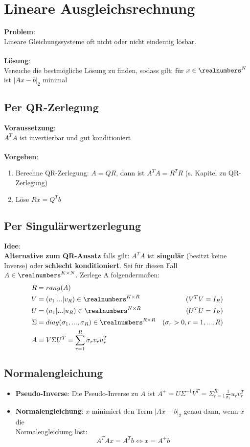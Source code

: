 \section{Lineare Ausgleichsrechnung}%
\label{lar:sec:lineare-ausgleichsrechnung}
\textbf{Problem}:\\Lineare Gleichungssysteme oft nicht oder nicht eindeutig lösbar.\\\\
\textbf{Lösung}:\\Versuche die bestmögliche Lösung zu finden, sodass gilt: für $x \in \realnumbers^N$ ist $|Ax - b|_2$ minimal

\subsection{Per QR-Zerlegung}%
\label{lar:sub:qr}
\textbf{Voraussetzung}:\\$A^TA$ ist invertierbar und gut konditioniert\\\\
\textbf{Vorgehen}:
\begin{enumerate}
	\item Berechne QR-Zerlegung: $A = QR$, dann ist $A^TA = R^TR$ (s. Kapitel zu QR-Zerlegung)
	\item Löse $Rx = Q^Tb$
\end{enumerate}

\subsection{Per Singulärwertzerlegung}%
\label{lar:sub:singulaerwertzerlegung}
\textbf{Idee}:\\\textbf{Alternative zum QR-Ansatz} falls gilt: $A^TA$ ist \textbf{singulär} (besitzt keine Inverse) oder \textbf{schlecht konditioniert}. Sei für diesen Fall $A \in \realnumbers^{K\times N}$. Zerlege A folgendermaßen:
\begin{align*}
	R &= rang(A)\\
	V &= (v_1 | ... | v_R) \in \realnumbers^{K \times R}& (V^TV = I_R)\\
	U &= (u_1 | ... | u_R) \in \realnumbers^{N \times R}& (U^TU = I_R)\\
	\Sigma &= diag(\sigma_1, ..., \sigma_R) \in \realnumbers^{R\times R}& (\sigma_r > 0, r = 1,...,R)\\
	A &= V\Sigma U^T = \sum^R_{r=1}\sigma_rv_ru_r^T &
\end{align*}

\subsection{Normalengleichung}%
\label{lar:sub:normalengleichung}
\begin{itemize}
	\item \textbf{Pseudo-Inverse}: Die Pseudo-Inverse zu $A$ ist $A^+ = U\Sigma^{-1}V^T = \Sigma^R_{r = 1}\frac{1}{\sigma_r}u_rv_r^T$
	\item \textbf{Normalengleichung}: $x$ minimiert den Term $|Ax - b|_2$ genau dann, wenn $x$ die\\Normalengleichung löst: $$A^TAx = A^Tb \Leftrightarrow x = A^+b$$
\end{itemize}	

